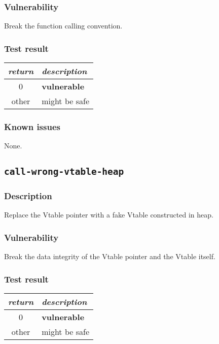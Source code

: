 \documentclass[a4paper]{book}
\begin{document}
\subsubsection{Vulnerability}
Break the function calling convention.

\subsubsection{Test result}
\begin{tabular}{cl}
  \toprule
  \emph{return}  & \emph{description} \\
  \midrule
  0              & \textbf{vulnerable} \\
  other          & might be safe \\
  \bottomrule
\end{tabular}

\subsubsection{Known issues}
None.

\newpage

\subsection{\texttt{call-wrong-vtable-heap}}\label{test-call-wrong-vtable-heap}

\subsubsection{Description}
Replace the Vtable pointer with a fake Vtable constructed in heap.

\subsubsection{Vulnerability}
Break the data integrity of the Vtable pointer and the Vtable itself.

\subsubsection{Test result}
\begin{tabular}{cl}
  \toprule
  \emph{return}  & \emph{description} \\
  \midrule
  0              & \textbf{vulnerable} \\
  other          & might be safe \\
  \bottomrule
\end{tabular}
\end{document}
